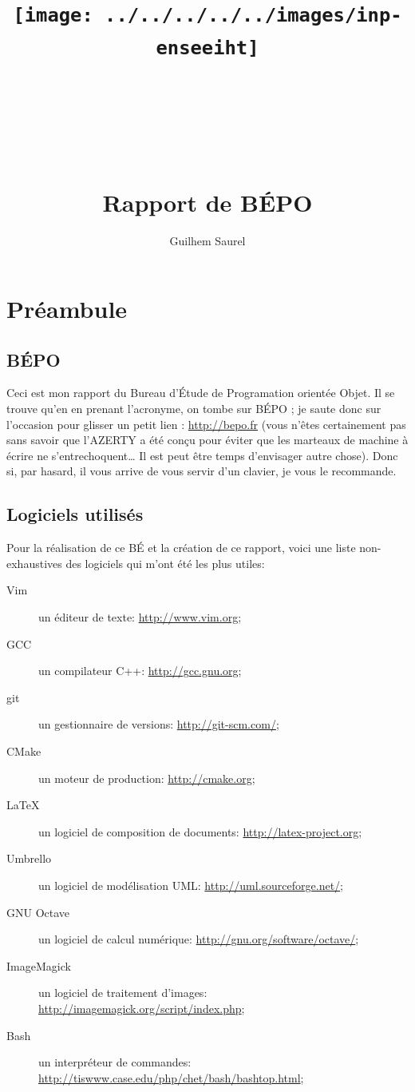 \documentclass{report}
\title{\texttt{[image: ../../../../../images/inp-enseeiht]} \\ ~ \\ ~ \\ ~ \\ ~ \\ Rapport de BÉPO}
\author{Guilhem Saurel}
\date{\oldstylenums{\today}}
\begin{document}
\begin{titlepage}
    \setcounter{page}{0}
    \maketitle
    \thispagestyle{empty}
\end{titlepage}

\tableofcontents
\newpage



\chapter*{Préambule}
\section{BÉPO}
Ceci est mon rapport du Bureau d’Étude de Programation orientée Objet. Il se trouve qu’en en prenant
l’acronyme, on tombe sur BÉPO ; je saute donc sur l’occasion pour glisser un petit lien : \url{http://bepo.fr}
(vous n’êtes certainement pas sans savoir que l’AZERTY a été conçu pour éviter que les marteaux de 
machine à écrire ne s’entrechoquent… Il est peut être temps d’envisager autre chose). Donc si,
par hasard, il vous arrive de vous servir d’un clavier, je vous le recommande.

\section{Logiciels utilisés}
Pour la réalisation de ce BÉ et la création de ce rapport, voici une liste non-exhaustives des 
logiciels qui m’ont été les plus utiles:
\begin{description}
    \item[Vim] un éditeur de texte: \url{http://www.vim.org};
    \item[GCC] un compilateur C++: \url{http://gcc.gnu.org};
    \item[git] un gestionnaire de versions: \url{http://git-scm.com/};
    \item[CMake] un moteur de production: \url{http://cmake.org};
    \item[\LaTeX] un logiciel de composition de documents: \url{http://latex-project.org};
    \item[Umbrello] un logiciel de modélisation UML: \url{http://uml.sourceforge.net/};
    \item[GNU Octave] un logiciel de calcul numérique: \url{http://gnu.org/software/octave/};
    \item[ImageMagick] un logiciel de traitement d’images: \url{http://imagemagick.org/script/index.php};
    \item[Bash] un interpréteur de commandes: \url{http://tiswww.case.edu/php/chet/bash/bashtop.html};
\end{description}
\end{document}
